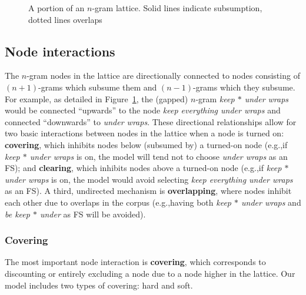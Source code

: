 \documentclass[11pt,letterpaper]{article}
\makeatletter
\def \eg {e.g.,\@ }
\newcommand{\gap}{$*$\xspace}
\newcommand{\ex}[1]{\textit{#1}\xspace}
\newcommand{\termdef}[1]{\textbf{#1}\xspace}
\newcommand{\figref}[2][]{Figure#1~\ref{#2}\xspace}
\makeatother
\begin{document}
\begin{figure}[!tb]
\caption{A portion of an $n$-gram lattice. Solid lines indicate subsumption, dotted lines overlaps}
\label{fig:example}
\end{figure}

\subsection{Node interactions}

The $n$-gram nodes in the lattice are directionally connected to nodes consisting of $(n+1)$-grams which subsume them and $(n-1)$-grams which they subsume. For example, as detailed in \figref{fig:example}, the (gapped) $n$-gram \ex{keep \gap under wraps} would be connected ``upwards'' to the node \ex{keep everything under wraps} and connected ``downwards'' to \ex{under wraps}. These directional relationships allow for two basic interactions between nodes in the lattice when a node is turned on: \termdef{covering}, which inhibits nodes below (subsumed by) a turned-on node (\eg if \ex{keep \gap under wraps} is on, the model will tend not to choose \ex{under wraps} as an FS); and \termdef{clearing}, which inhibits nodes above a turned-on node (\eg if \ex{keep \gap under wraps} is on, the model would avoid selecting \ex{keep everything under wraps} as an FS). A third, undirected mechanism is \termdef{overlapping}, where nodes inhibit each other due to overlaps in the corpus (\eg having both \ex{keep \gap under wraps} and \ex{be keep \gap under} as FS will be avoided).


\subsubsection{Covering}
The most important node interaction is \termdef{covering}, which corresponds to discounting or entirely excluding a node due to a node higher in the lattice. Our model includes two types of covering: hard and soft. 
\end{document}
